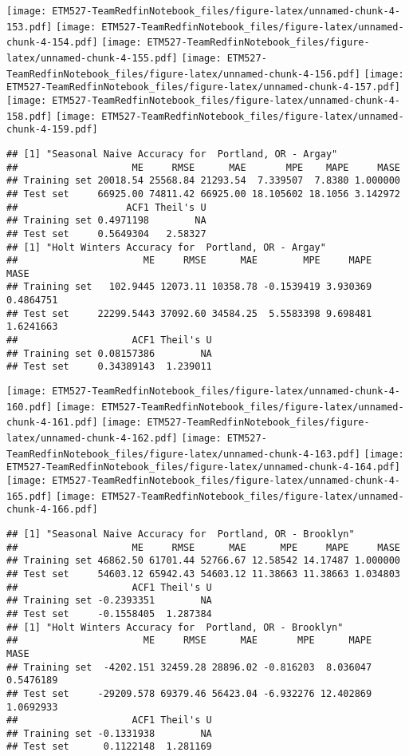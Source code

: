 \documentclass[]{article}
\begin{document}
\texttt{[image: ETM527-TeamRedfinNotebook\_files/figure-latex/unnamed-chunk-4-153.pdf]}
\texttt{[image: ETM527-TeamRedfinNotebook\_files/figure-latex/unnamed-chunk-4-154.pdf]}
\texttt{[image: ETM527-TeamRedfinNotebook\_files/figure-latex/unnamed-chunk-4-155.pdf]}
\texttt{[image: ETM527-TeamRedfinNotebook\_files/figure-latex/unnamed-chunk-4-156.pdf]}
\texttt{[image: ETM527-TeamRedfinNotebook\_files/figure-latex/unnamed-chunk-4-157.pdf]}
\texttt{[image: ETM527-TeamRedfinNotebook\_files/figure-latex/unnamed-chunk-4-158.pdf]}
\texttt{[image: ETM527-TeamRedfinNotebook\_files/figure-latex/unnamed-chunk-4-159.pdf]}

\begin{verbatim}
## [1] "Seasonal Naive Accuracy for  Portland, OR - Argay"
##                    ME     RMSE      MAE       MPE    MAPE     MASE
## Training set 20018.54 25568.84 21293.54  7.339507  7.8380 1.000000
## Test set     66925.00 74811.42 66925.00 18.105602 18.1056 3.142972
##                   ACF1 Theil's U
## Training set 0.4971198        NA
## Test set     0.5649304   2.58327
## [1] "Holt Winters Accuracy for  Portland, OR - Argay"
##                      ME     RMSE      MAE        MPE     MAPE      MASE
## Training set   102.9445 12073.11 10358.78 -0.1539419 3.930369 0.4864751
## Test set     22299.5443 37092.60 34584.25  5.5583398 9.698481 1.6241663
##                    ACF1 Theil's U
## Training set 0.08157386        NA
## Test set     0.34389143  1.239011
\end{verbatim}

\texttt{[image: ETM527-TeamRedfinNotebook\_files/figure-latex/unnamed-chunk-4-160.pdf]}
\texttt{[image: ETM527-TeamRedfinNotebook\_files/figure-latex/unnamed-chunk-4-161.pdf]}
\texttt{[image: ETM527-TeamRedfinNotebook\_files/figure-latex/unnamed-chunk-4-162.pdf]}
\texttt{[image: ETM527-TeamRedfinNotebook\_files/figure-latex/unnamed-chunk-4-163.pdf]}
\texttt{[image: ETM527-TeamRedfinNotebook\_files/figure-latex/unnamed-chunk-4-164.pdf]}
\texttt{[image: ETM527-TeamRedfinNotebook\_files/figure-latex/unnamed-chunk-4-165.pdf]}
\texttt{[image: ETM527-TeamRedfinNotebook\_files/figure-latex/unnamed-chunk-4-166.pdf]}

\begin{verbatim}
## [1] "Seasonal Naive Accuracy for  Portland, OR - Brooklyn"
##                    ME     RMSE      MAE      MPE     MAPE     MASE
## Training set 46862.50 61701.44 52766.67 12.58542 14.17487 1.000000
## Test set     54603.12 65942.43 54603.12 11.38663 11.38663 1.034803
##                    ACF1 Theil's U
## Training set -0.2393351        NA
## Test set     -0.1558405  1.287384
## [1] "Holt Winters Accuracy for  Portland, OR - Brooklyn"
##                      ME     RMSE      MAE       MPE      MAPE      MASE
## Training set  -4202.151 32459.28 28896.02 -0.816203  8.036047 0.5476189
## Test set     -29209.578 69379.46 56423.04 -6.932276 12.402869 1.0692933
##                    ACF1 Theil's U
## Training set -0.1331938        NA
## Test set      0.1122148  1.281169
\end{verbatim}
\end{document}

